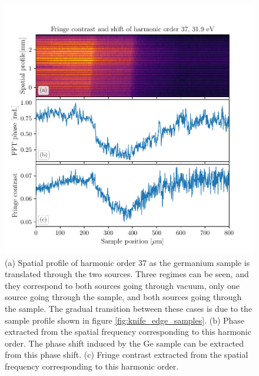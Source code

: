 \begin{figure}
	\centering
	\includegraphics[width=1.0\textwidth]{figures/refractive_index/spatialgram_fringe_shift_contrast_ge.pdf}
	\caption[Spatial profile and fringe shift of a harmonic as sample is translated across the two XUV sources]{(a) Spatial profile of harmonic order 37 as the germanium sample is translated through the two sources. Three regimes can be seen, and they correspond to both sources going through vacuum, only one source going through the sample, and both sources going through the sample.  The gradual transition between these cases is due to the sample profile shown in figure \ref{fig:knife_edge_samples}. (b) Phase extracted from the spatial frequency corresponding to this harmonic order.  The phase shift induced by the Ge sample can be extracted from this phase shift. (c) Fringe contrast extracted from the spatial frequency corresponding to this harmonic order.}
	\label{fig:harmonic_fringe_shift_contrast_ge}
\end{figure}


